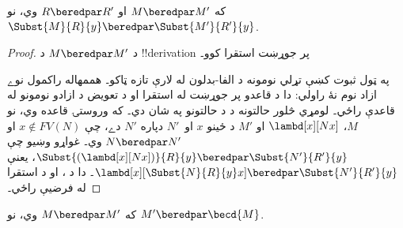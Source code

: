 \documentclass[../../../include/open-logic-section]{subfiles}
\begin{document}
\begin{lem}
  که $M \beredpar M'$ او $R \beredpar R'$ وي، نو $\Subst{M}{R}{y}
  \beredpar \Subst{M'}{R'}{y}$.
\end{lem}

\begin{proof}
  د $M \beredpar M'$ د !!{derivation} پر جوړښت استقرا کوو۔

  په ټول ثبوت کښې تړلي نومونه د الفا-بدلون له لارې تازه ټاکو۔ هممهاله راکمول نوے ازاد نوم نۀ راولي: دا د قاعدو پر جوړښت له استقرا او د تعويض د ازادو نومونو له قاعدې راځي۔ لومړي څلور حالتونه د  د حالتونو په شان دي۔
  که وروستۍ قاعده  وي، نو $M$،
  $\lambd[x][Nx]$ او $M'$ د ځينو $x$ او~$N'$ دپاره $N'$
  دے، چې $x \notin FV(N)$ او $N \beredpar N'$ وي۔ غواړو
  وښيو چې $\Subst{(\lambd[x][Nx])}{R}{y} \beredpar
  \Subst{N'}{R'}{y}$، يعنې
  $\lambd[x][\Subst{N}{R}{y} x] \beredpar \Subst{N'}{R'}{y}$۔
  دا د ،  او
  د استقرا له فرضيې راځي۔
\end{proof}

\begin{lem}
  که $M \beredpar M'$ وي، نو $M' \beredpar \becd{M}$.
\end{lem}
\end{document}
